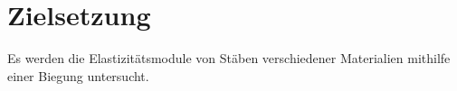 
\section{Zielsetzung}
\label{sec:Zielsetzung}
Es werden die Elastizitätsmodule von Stäben verschiedener Materialien mithilfe einer Biegung untersucht.
